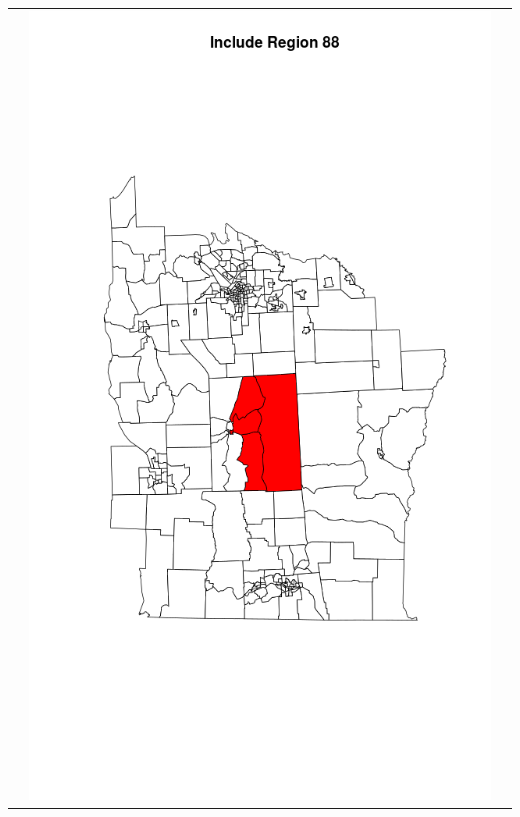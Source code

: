 \documentclass[12pt]{article}
\begin{document}
\begin{tabular}{|c|c|c|}
							& \includegraphics[scale=0.2]{ny88.png}

\end{tabular}
\end{document}
